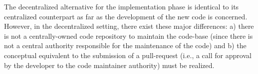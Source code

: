
The decentralized alternative for the implementation phase is identical to its centralized counterpart as far as the development of the new code is concerned. However, in the decentralized setting, there exist these major differences:
a) there is not a centrally-owned code repository to maintain the code-base 
(since there is not a central authority responsible for the maintenance of the 
code) and b) the conceptual equivalent to the submission of a pull-request 
(i.e., a call for approval by the developer to the code maintainer authority) 
must be realized.

%



